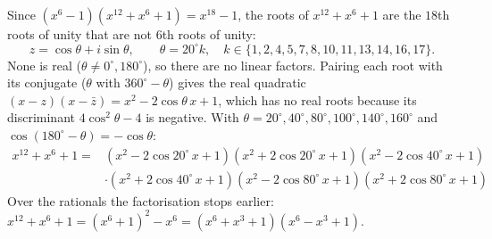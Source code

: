 Since $\left(x^6-1\right)\left(x^{12}+x^6+1\right)=x^{18}-1$, the roots of $x^{12}+x^6+1$ are the $18$th roots of unity that are not $6$th roots of unity:
\[z=\cos\theta+i\sin\theta,\qquad\theta=20^\circ k,\quad k\in\{1,2,4,5,7,8,10,11,13,14,16,17\}.\]
None is real ($\theta\ne0^\circ,180^\circ$), so there are no linear factors. Pairing each root with its conjugate ($\theta$ with $360^\circ-\theta$) gives the real quadratic $(x-z)(x-\bar z)=x^2-2\cos\theta\,x+1$, which has no real roots because its discriminant $4\cos^2\theta-4$ is negative. With $\theta=20^\circ,40^\circ,80^\circ,100^\circ,140^\circ,160^\circ$ and $\cos(180^\circ-\theta)=-\cos\theta$:
\[\boxed{\begin{aligned}x^{12}+x^6+1={}&\left(x^2-2\cos20^\circ\,x+1\right)\left(x^2+2\cos20^\circ\,x+1\right)\left(x^2-2\cos40^\circ\,x+1\right)\\&\cdot\left(x^2+2\cos40^\circ\,x+1\right)\left(x^2-2\cos80^\circ\,x+1\right)\left(x^2+2\cos80^\circ\,x+1\right)\end{aligned}}\]
Over the rationals the factorisation stops earlier: $x^{12}+x^6+1=\left(x^6+1\right)^2-x^6=\left(x^6+x^3+1\right)\left(x^6-x^3+1\right)$.
